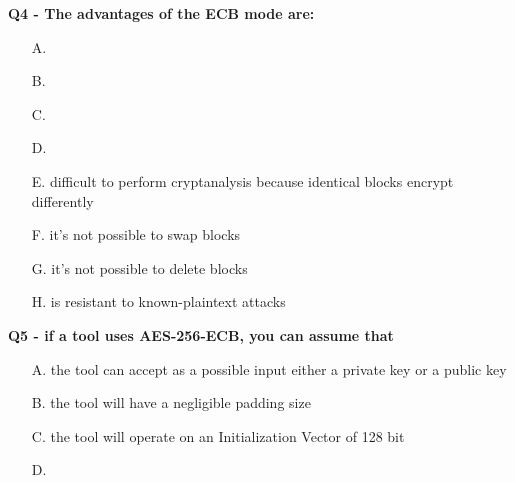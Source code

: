 \textbf{Q4 - The advantages of the ECB mode are:}
\begin{enumerate}
    \item[A.] 
    \item[B.] 
    \item[C.] 
    \item[D.] 
    \item[E.] difficult to perform cryptanalysis because identical blocks encrypt differently
    \item[F.] it’s not possible to swap blocks
    \item[G.] it’s not possible to delete blocks
    \item[H.] is resistant to known-plaintext attacks
\end{enumerate}


\textbf{Q5 - if a tool uses AES-256-ECB, you can assume that}
\begin{enumerate}
    \item[A.] the tool can accept as a possible input either a private key or a public key
    \item[B.] the tool will have a negligible padding size
    \item[C.] the tool will operate on an Initialization Vector of 128 bit
    \item[D.] 
\end{enumerate}



